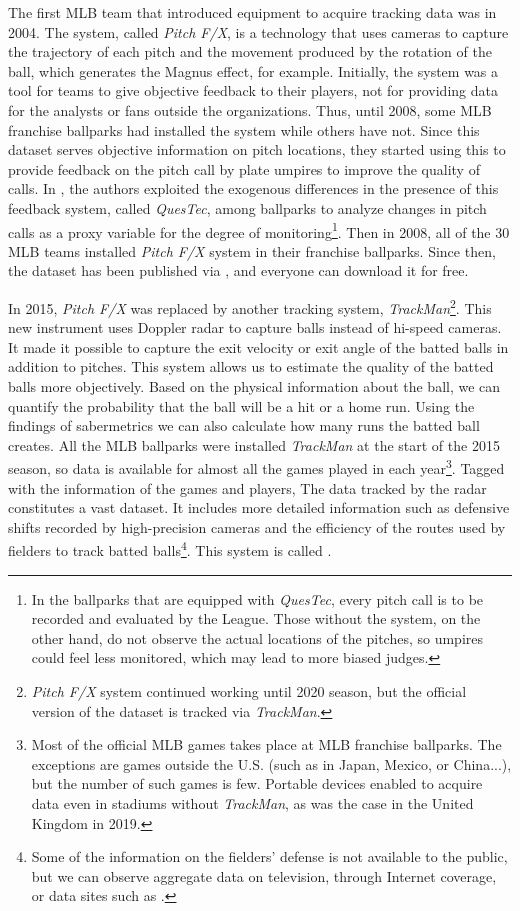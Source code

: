 \documentclass[dvipdfmx, 12pt]{jsarticle}
\begin{document}
The first MLB team that introduced equipment to acquire tracking data was in 2004. The system, called \textit{Pitch F/X}, is a technology that uses cameras to capture the trajectory of each pitch and the movement produced by the rotation of the ball, which generates the Magnus effect, for example. Initially, the system was a tool for teams to give objective feedback to their players, not for providing data for the analysts or fans outside the organizations. Thus, until 2008, some MLB franchise ballparks had installed the system while others have not. Since this dataset serves objective information on pitch locations, they started using this to provide feedback on the pitch call by plate umpires to improve the quality of calls. In \citet{Parsons_etal_2011}, the authors exploited the exogenous differences in the presence of this feedback system, called \textit{QuesTec}, among ballparks to analyze changes in pitch calls as a proxy variable for the degree of monitoring\footnote{In the ballparks that are equipped with \textit{QuesTec}, every pitch call is to be recorded and evaluated by the League. Those without the system, on the other hand, do not observe the actual locations of the pitches, so umpires could feel less monitored, which may lead to more biased judges.}. Then in 2008, all of the 30 MLB teams installed \textit{Pitch F/X} system in their franchise ballparks. Since then, the dataset has been published via \citet{baseballsavant}, and everyone can download it for free.

In 2015, \textit{Pitch F/X} was replaced by another tracking system, \textit{TrackMan}\footnote{\textit{Pitch F/X} system continued working until 2020 season, but the official version of the dataset is tracked via \textit{TrackMan}.}. This new instrument uses Doppler radar to capture balls instead of hi-speed cameras. It made it possible to capture the exit velocity or exit angle of the batted balls in addition to pitches. This system allows us to estimate the quality of the batted balls more objectively. Based on the physical information about the ball, we can quantify the probability that the ball will be a hit or a home run. Using the findings of sabermetrics we can also calculate how many runs the batted ball creates. All the MLB ballparks were installed \textit{TrackMan} at the start of the 2015 season, so data is available for almost all the games played in each year\footnote{Most of the official MLB games takes place at MLB franchise ballparks. The exceptions are games outside the U.S. (such as in Japan, Mexico, or China...),  but the number of such games is few. Portable devices enabled to acquire data even in stadiums without \textit{TrackMan}, as was the case in the United Kingdom in 2019.}. Tagged with the information of the games and players, The data tracked by the radar constitutes a vast dataset. It includes more detailed information such as defensive shifts recorded by high-precision cameras and the efficiency of the routes used by fielders to track batted balls\footnote{Some of the information on the fielders' defense is not available to the public, but we can observe aggregate data on television, through Internet coverage, or data sites such as \citet{baseballsavant}.}. This system is called \citet{statcast}.
\end{document}

